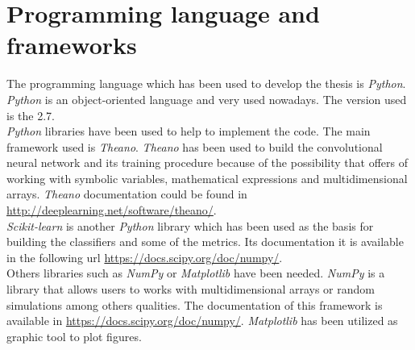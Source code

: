 \section{Programming language and frameworks}
The  programming language which has been used to develop the thesis is \textit{Python}. \textit{Python} is an object-oriented language and very used nowadays. The version used is the 2.7.\\

\textit{Python} libraries have been used to help to implement the code. The main framework used is \textit{Theano}. \textit{Theano} has been used to build the convolutional neural network and its training procedure because of the possibility that offers of working with symbolic variables, mathematical expressions and multidimensional arrays. \textit{Theano} documentation could be found in \url{http://deeplearning.net/software/theano/}.\\

\textit{Scikit-learn} is another \textit{Python} library which has been used as the basis for building the classifiers and some of the metrics. Its documentation it is available in the following url \url{https://docs.scipy.org/doc/numpy/}.\\

Others libraries such as \textit{NumPy} or \textit{Matplotlib} have been needed. \textit{NumPy} is a library that allows users to works with multidimensional arrays or random simulations among others qualities. The documentation of this framework is available in \url{https://docs.scipy.org/doc/numpy/}. \textit{Matplotlib} has been utilized as graphic tool to plot figures.
